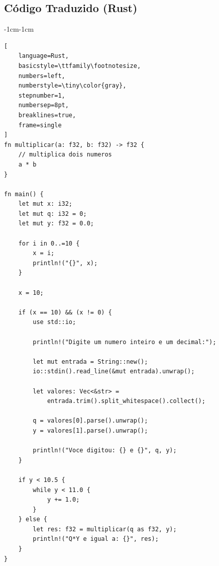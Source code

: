\documentclass[a4paper,12pt]{article}
\begin{document}
\newpage
\subsection{Código Traduzido (Rust)}
\begin{adjustwidth}{-1cm}{-1cm}
\begin{lstlisting}[
    language=Rust,
    basicstyle=\ttfamily\footnotesize,
    numbers=left,
    numberstyle=\tiny\color{gray},
    stepnumber=1,
    numbersep=8pt,
    breaklines=true,
    frame=single
]
fn multiplicar(a: f32, b: f32) -> f32 {
    // multiplica dois numeros
    a * b
}

fn main() {
    let mut x: i32;
    let mut q: i32 = 0;
    let mut y: f32 = 0.0;

    for i in 0..=10 {
        x = i;
        println!("{}", x);
    }

    x = 10;

    if (x == 10) && (x != 0) {
        use std::io;

        println!("Digite um numero inteiro e um decimal:");

        let mut entrada = String::new();
        io::stdin().read_line(&mut entrada).unwrap();

        let valores: Vec<&str> =
            entrada.trim().split_whitespace().collect();

        q = valores[0].parse().unwrap();
        y = valores[1].parse().unwrap();

        println!("Voce digitou: {} e {}", q, y);
    }

    if y < 10.5 {
        while y < 11.0 {
            y += 1.0;
        }
    } else {
        let res: f32 = multiplicar(q as f32, y);
        println!("Q*Y e igual a: {}", res);
    }
}
\end{lstlisting}
\end{adjustwidth}

\end{document}
